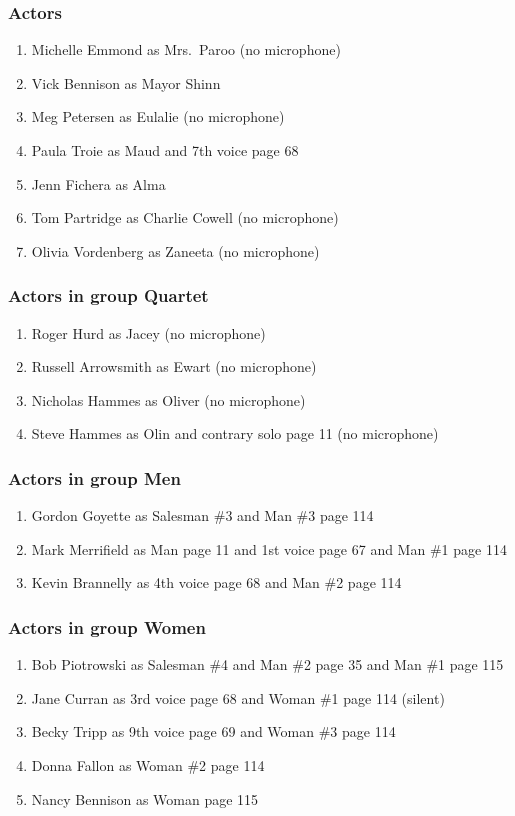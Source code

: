 \subsubsection{Actors}
\begin{enumerate}
\item Michelle Emmond as Mrs.~Paroo (no microphone)
\item Vick Bennison as Mayor Shinn
\item Meg Petersen as Eulalie (no microphone)
\item Paula Troie as Maud and 7th voice page 68
\item Jenn Fichera as Alma
\item Tom Partridge as Charlie Cowell (no microphone)
\item Olivia Vordenberg as Zaneeta (no microphone)
\end{enumerate}
\subsubsection{Actors in group Quartet}
\begin{enumerate}
\item Roger Hurd as Jacey (no microphone)
\item Russell Arrowsmith as Ewart (no microphone)
\item Nicholas Hammes as Oliver (no microphone)
\item Steve Hammes as Olin and contrary solo page 11 (no microphone)
\end{enumerate}
\subsubsection{Actors in group Men}
\begin{enumerate}
\item Gordon Goyette as Salesman \#3 and Man \#3 page 114
\item Mark Merrifield as Man page 11 and 1st voice page 67 and Man \#1 page 114
\item Kevin Brannelly as 4th voice page 68 and Man \#2 page 114
\end{enumerate}
\subsubsection{Actors in group Women}
\begin{enumerate}
\item Bob Piotrowski as Salesman \#4 and Man \#2 page 35 and Man \#1 page 115
\item Jane Curran as 3rd voice page 68 and Woman \#1 page 114 (silent)
\item Becky Tripp as 9th voice page 69 and Woman \#3 page 114
\item Donna Fallon as Woman \#2 page 114
\item Nancy Bennison as Woman page 115
\end{enumerate}

